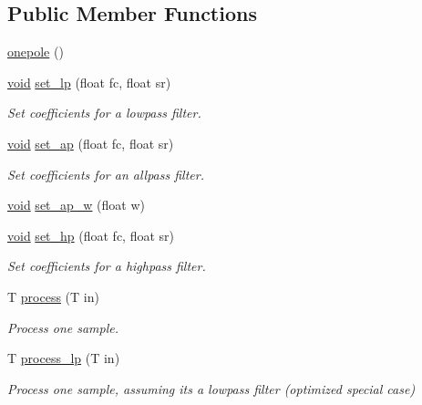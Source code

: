 \subsection*{Public Member Functions}
\begin{DoxyCompactItemize}
\item 
\hyperlink{classdsp_1_1onepole_a6a29484ab686197b64f7d6d8872706ad}{onepole} ()
\item 
\hyperlink{tk_8h_aba408b7cd755a96426e004c015f5de8e}{void} \hyperlink{classdsp_1_1onepole_afcc16a107ad32e99890f31091846c655}{set\+\_\+lp} (float fc, float sr)
\begin{DoxyCompactList}\small\item\em Set coefficients for a lowpass filter. \end{DoxyCompactList}\item 
\hyperlink{tk_8h_aba408b7cd755a96426e004c015f5de8e}{void} \hyperlink{classdsp_1_1onepole_a939fe858452e1f1b9a0e68de5dbf1f68}{set\+\_\+ap} (float fc, float sr)
\begin{DoxyCompactList}\small\item\em Set coefficients for an allpass filter. \end{DoxyCompactList}\item 
\hyperlink{tk_8h_aba408b7cd755a96426e004c015f5de8e}{void} \hyperlink{classdsp_1_1onepole_aeaf997e6a253519b1bdca33140b19a6a}{set\+\_\+ap\+\_\+w} (float w)
\item 
\hyperlink{tk_8h_aba408b7cd755a96426e004c015f5de8e}{void} \hyperlink{classdsp_1_1onepole_ab97a2d677e34c7632abff18b56d32d11}{set\+\_\+hp} (float fc, float sr)
\begin{DoxyCompactList}\small\item\em Set coefficients for a highpass filter. \end{DoxyCompactList}\item 
T \hyperlink{classdsp_1_1onepole_a523462e7a7952e48a68d62399a56c096}{process} (T in)
\begin{DoxyCompactList}\small\item\em Process one sample. \end{DoxyCompactList}\item 
T \hyperlink{classdsp_1_1onepole_a1269577e3ca2bb9071f9a1fe00454f73}{process\+\_\+lp} (T in)
\begin{DoxyCompactList}\small\item\em Process one sample, assuming it\textquotesingle{}s a lowpass filter (optimized special case) \end{DoxyCompactList}\item 

\end{DoxyCompactItemize}
